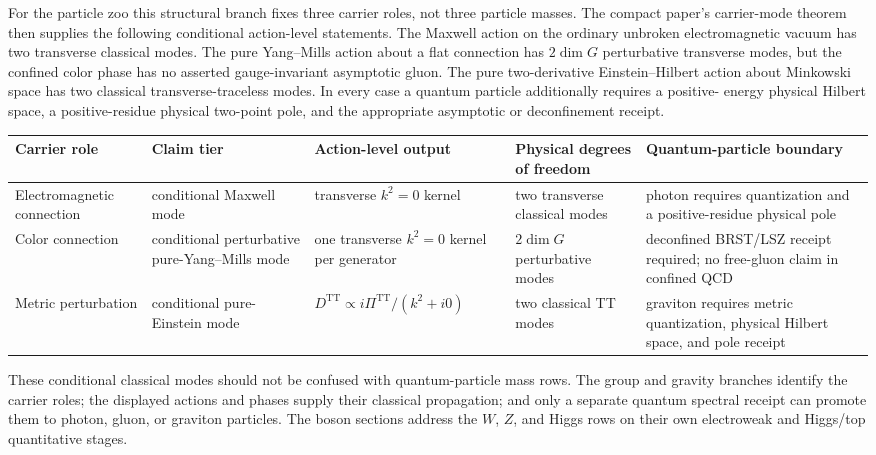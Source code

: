 \documentclass[11pt]{article}
\begin{document}
For the particle zoo this structural branch fixes three carrier roles, not three particle masses.
The compact paper's carrier-mode theorem then supplies the following conditional action-level
statements. The Maxwell action on the ordinary unbroken electromagnetic vacuum has two transverse
classical modes. The pure Yang--Mills action about a flat connection has \(2\dim G\) perturbative
transverse modes, but the confined color phase has no asserted gauge-invariant asymptotic gluon.
The pure two-derivative Einstein--Hilbert action about Minkowski space has two classical
transverse-traceless modes. In every case a quantum particle additionally requires a positive-
energy physical Hilbert space, a positive-residue physical two-point pole, and the appropriate
asymptotic or deconfinement receipt.

\begin{table}[h]
\centering
\small
\begin{tabular}{@{}>{\raggedright\arraybackslash}p{}>{\raggedright\arraybackslash}p{}>{\raggedright\arraybackslash}p{}>{\raggedright\arraybackslash}p{}>{\raggedright\arraybackslash}p{}@{}}
\toprule
Carrier role & Claim tier & Action-level output & Physical degrees of freedom & Quantum-particle boundary \\
\midrule
Electromagnetic connection & conditional Maxwell mode & transverse \(k^2=0\) kernel & two transverse classical modes & photon requires quantization and a positive-residue physical pole \\
Color connection & conditional perturbative pure-Yang--Mills mode & one transverse \(k^2=0\) kernel per generator & \(2\dim G\) perturbative modes & deconfined BRST/LSZ receipt required; no free-gluon claim in confined QCD \\
Metric perturbation & conditional pure-Einstein mode & \(D^{\mathrm{TT}}\propto i\Pi^{\mathrm{TT}}/(k^2+i0)\) & two classical TT modes & graviton requires metric quantization, physical Hilbert space, and pole receipt \\
\bottomrule
\end{tabular}
\end{table}

These conditional classical modes should not be confused with quantum-particle mass rows. The
group and gravity branches identify the carrier roles; the displayed actions and phases supply
their classical propagation; and only a separate quantum spectral receipt can promote them to
photon, gluon, or graviton particles. The boson sections address the \(W\), \(Z\), and Higgs
rows on their own electroweak and Higgs/top quantitative stages.
\end{document}
